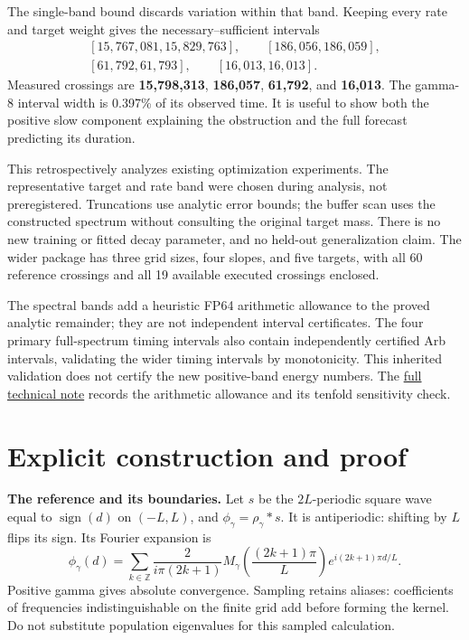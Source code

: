 \documentclass[11pt]{article}
\DeclareMathOperator{\sign}{sign}
\theoremstyle{definition}
\newcommand{\repo}{https://github.com/samlayton99/precision-mlps/blob/experiment/frozen-gamma-probe}
\begin{document}
The single-band bound discards variation within that band. Keeping every
rate and target weight gives the necessary--sufficient intervals
\[
\begin{gathered}
\left[15{,}767{,}081,15{,}829{,}763\right],\qquad
\left[186{,}056,186{,}059\right],\\
\left[61{,}792,61{,}793\right],\qquad
\left[16{,}013,16{,}013\right].
\end{gathered}
\]
Measured crossings are \textbf{15,798,313}, \textbf{186,057},
\textbf{61,792}, and \textbf{16,013}. The gamma-8 interval width is
0.397\% of its observed time. It is useful to show both the positive slow
component explaining the obstruction and the full forecast predicting
its duration.

This retrospectively analyzes existing optimization experiments. The
representative target and rate band were chosen during analysis, not
preregistered. Truncations use analytic error bounds; the buffer scan uses
the constructed spectrum without consulting the original target mass.
There is no new training or fitted decay parameter, and no held-out
generalization claim. The wider package has three grid sizes, four slopes,
and five targets, with all 60 reference crossings and all 19 available
executed crossings enclosed.

The spectral bands add a heuristic FP64 arithmetic allowance to the proved
analytic remainder; they are not independent interval certificates.
The four primary full-spectrum timing intervals also contain independently
certified Arb intervals, validating the wider timing intervals by monotonicity.
This inherited validation does not certify the new positive-band energy
numbers. The \href{\repo/docs/gamma_uniform_grid_theorem.md}{full technical
note} records the arithmetic allowance and its tenfold sensitivity check.

\appendix
\section{Explicit construction and proof}
\textbf{The reference and its boundaries.}
Let $s$ be the $2L$-periodic square wave equal to $\sign(d)$ on $(-L,L)$,
and $\phi_\gamma=\rho_\gamma*s$. It is antiperiodic: shifting by $L$ flips
its sign. Its Fourier expansion is
\[
\phi_\gamma(d)=\sum_{k\in\mathbb Z}\frac2{i\pi(2k+1)}
M_\gamma\!\left(\frac{(2k+1)\pi}{L}\right)e^{i(2k+1)\pi d/L}.
\]
Positive gamma gives absolute convergence. Sampling retains aliases:
coefficients of frequencies indistinguishable on the finite grid add
before forming the kernel. Do not substitute population eigenvalues
for this sampled calculation.
\end{document}
